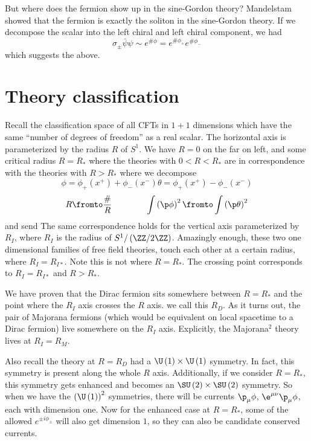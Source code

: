 \documentclass{booc}
\begin{document}
But where does the fermion show up in the sine-Gordon theory?
Mandelstam showed that the fermion is exactly the soliton in the sine-Gordon theory.
If we decompose the scalar into the left chiral and left chiral component, we had
\begin{equation}
\sigma_{\pm}
\bar \psi \psi \sim e^{\# \phi} = e^{\# \phi_+} e^{\# \phi_-}
\end{equation}
which suggests the above.

\section{Theory classification}

Recall the classification space of all CFTs in $1+1$ dimensions which
have the same ``number of degrees of freedom'' as a real scalar.
The horizontal axis is parameterized by the radius $R$ of $S^1$.
We have $R = 0$ on the far on left, and some critical radius $R = R_*$ 
where the theories with $0 < R < R_*$ are in correspondence with the theories
with $R > R_*$ where we decompose
\begin{equation}
\phi = \phi_+\left( x^+ \right) + \phi_-\left( x^- \right)
\theta = \phi_+\left( x^+ \right) - \phi_-\left( x^- \right)
\end{equation}
\begin{equation}
R\fromto \frac{\#}{R}
\qquad\qquad
\int \left( \p\phi \right)^2\fromto \int\left( \p\theta \right)^2
\end{equation}
and send 
The same correspondence holds for the vertical axis parameterized by
$R_I$, where $R_I$ is the radius of $S^1 / \left( \ZZ / 2\ZZ \right)$.
Amazingly enough, these two one dimensional families of free field theories, touch each other
at a certain radius, where $R_I = R_{I*}$. 
Note this is not where $R = R_*$. 
The crossing point corresponds to $R_I = R_{I*}$ and $R > R_*$.

We have proven that the Dirac fermion sits somewhere
between $R = R_*$ and the point where the $R_I$ axis crosses the $R$ axis.
we call this $R_D$. 
As it turns out, the pair of Majorana fermions
(which would be equivalent on local spacetime to a Dirac fermion)
live somewhere on the $R_I$ axis. 
Explicitly, the Majorana$^2$ theory lives at $R_I = R_M$.

Also recall the theory at $R = R_D$ 
had a $\U\left( 1 \right)\times \U\left( 1 \right)$ symmetry.
In fact, this symmetry is present along the whole $R$ axis.
Additionally, if we consider $R = R_*$, 
this symmetry gets enhanced and becomes an 
$\SU\left( 2 \right)\times \SU\left( 2 \right)$ symmetry.
So when we have the $\left( \U\left( 1 \right) \right)^2$ symmetries,
there will be currents $\p_\mu \phi$, $\e^{\mu\nu}\p_\mu \phi$, each with
dimension one.
Now for the enhanced case at $R = R_*$, 
some of the allowed $e^{\pm i \phi_{\pm}}$ will also get dimension $1$, 
so they can also be candidate conserved currents.
\end{document}
